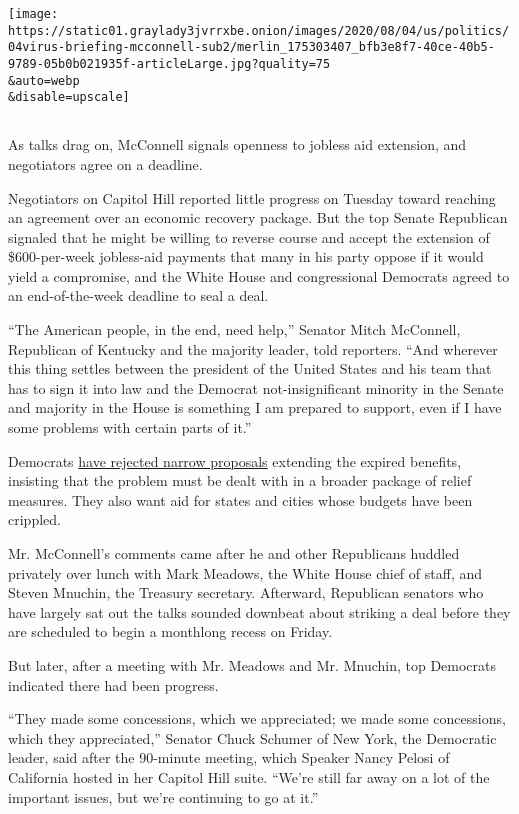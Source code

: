 \texttt{[image: https://static01.graylady3jvrrxbe.onion/images/2020/08/04/us/politics/04virus-briefing-mcconnell-sub2/merlin\_175303407\_bfb3e8f7-40ce-40b5-9789-05b0b021935f-articleLarge.jpg?quality=75\\\&auto=webp\\\&disable=upscale]}

\subsection{}

As talks drag on, McConnell signals openness to jobless aid extension,
and negotiators agree on a deadline.

Negotiators on Capitol Hill reported little progress on Tuesday toward
reaching an agreement over an economic recovery package. But the top
Senate Republican signaled that he might be willing to reverse course
and accept the extension of \$600-per-week jobless-aid payments that
many in his party oppose if it would yield a compromise, and the White
House and congressional Democrats agreed to an end-of-the-week deadline
to seal a deal.

``The American people, in the end, need help,'' Senator Mitch McConnell,
Republican of Kentucky and the majority leader, told reporters. ``And
wherever this thing settles between the president of the United States
and his team that has to sign it into law and the Democrat
not-insignificant minority in the Senate and majority in the House is
something I am prepared to support, even if I have some problems with
certain parts of it.''

Democrats
\href{https://www.nytimes3xbfgragh.onion/2020/08/02/us/politics/coronavirus-jobless-aid.html}{have
rejected narrow proposals} extending the expired benefits, insisting
that the problem must be dealt with in a broader package of relief
measures. They also want aid for states and cities whose budgets have
been crippled.

Mr. McConnell's comments came after he and other Republicans huddled
privately over lunch with Mark Meadows, the White House chief of staff,
and Steven Mnuchin, the Treasury secretary. Afterward, Republican
senators who have largely sat out the talks sounded downbeat about
striking a deal before they are scheduled to begin a monthlong recess on
Friday.

But later, after a meeting with Mr. Meadows and Mr. Mnuchin, top
Democrats indicated there had been progress.

``They made some concessions, which we appreciated; we made some
concessions, which they appreciated,'' Senator Chuck Schumer of New
York, the Democratic leader, said after the 90-minute meeting, which
Speaker Nancy Pelosi of California hosted in her Capitol Hill suite.
``We're still far away on a lot of the important issues, but we're
continuing to go at it.''

